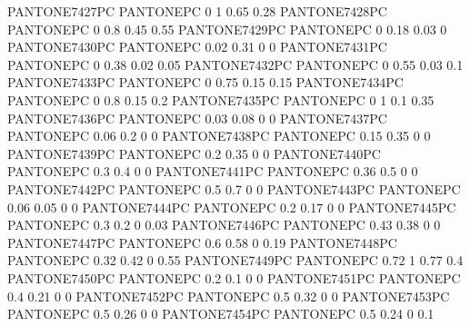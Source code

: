  {PANTONE7427PC} {PANTONE\SpotSpace PC} {0 1 0.65 0.28}
 {PANTONE7428PC} {PANTONE\SpotSpace PC} {0 0.8 0.45 0.55}
 {PANTONE7429PC} {PANTONE\SpotSpace PC} {0 0.18 0.03 0}
 {PANTONE7430PC} {PANTONE\SpotSpace PC} {0.02 0.31 0 0}
 {PANTONE7431PC} {PANTONE\SpotSpace PC} {0 0.38 0.02 0.05}
 {PANTONE7432PC} {PANTONE\SpotSpace PC} {0 0.55 0.03 0.1}
 {PANTONE7433PC} {PANTONE\SpotSpace PC} {0 0.75 0.15 0.15}
 {PANTONE7434PC} {PANTONE\SpotSpace PC} {0 0.8 0.15 0.2}
 {PANTONE7435PC} {PANTONE\SpotSpace PC} {0 1 0.1 0.35}
 {PANTONE7436PC} {PANTONE\SpotSpace PC} {0.03 0.08 0 0}
 {PANTONE7437PC} {PANTONE\SpotSpace PC} {0.06 0.2 0 0}
 {PANTONE7438PC} {PANTONE\SpotSpace PC} {0.15 0.35 0 0}
 {PANTONE7439PC} {PANTONE\SpotSpace PC} {0.2 0.35 0 0}
 {PANTONE7440PC} {PANTONE\SpotSpace PC} {0.3 0.4 0 0}
 {PANTONE7441PC} {PANTONE\SpotSpace PC} {0.36 0.5 0 0}
 {PANTONE7442PC} {PANTONE\SpotSpace PC} {0.5 0.7 0 0}
 {PANTONE7443PC} {PANTONE\SpotSpace PC} {0.06 0.05 0 0}
 {PANTONE7444PC} {PANTONE\SpotSpace PC} {0.2 0.17 0 0}
 {PANTONE7445PC} {PANTONE\SpotSpace PC} {0.3 0.2 0 0.03}
 {PANTONE7446PC} {PANTONE\SpotSpace PC} {0.43 0.38 0 0}
 {PANTONE7447PC} {PANTONE\SpotSpace PC} {0.6 0.58 0 0.19}
 {PANTONE7448PC} {PANTONE\SpotSpace PC} {0.32 0.42 0 0.55}
 {PANTONE7449PC} {PANTONE\SpotSpace PC} {0.72 1 0.77 0.4}
 {PANTONE7450PC} {PANTONE\SpotSpace PC} {0.2 0.1 0 0}
 {PANTONE7451PC} {PANTONE\SpotSpace PC} {0.4 0.21 0 0}
 {PANTONE7452PC} {PANTONE\SpotSpace PC} {0.5 0.32 0 0}
 {PANTONE7453PC} {PANTONE\SpotSpace PC} {0.5 0.26 0 0}
 {PANTONE7454PC} {PANTONE\SpotSpace PC} {0.5 0.24 0 0.1}
